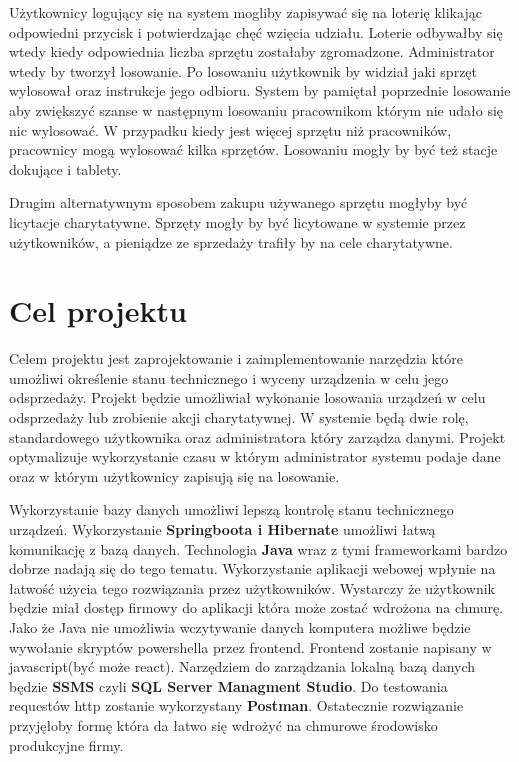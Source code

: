 Użytkownicy logujący się na system mogliby zapisywać się na loterię klikając odpowiedni przycisk i potwierdzając chęć wzięcia udziału. Loterie odbywałby się wtedy kiedy odpowiednia liczba sprzętu zostałaby zgromadzone. Administrator wtedy by tworzył losowanie. Po losowaniu użytkownik by widział jaki sprzęt wylosował oraz instrukcje jego odbioru. System by pamiętał poprzednie losowanie aby zwiększyć szanse w następnym losowaniu pracownikom którym nie udało się nic wylosować. W przypadku kiedy jest więcej sprzętu niż pracowników, pracownicy mogą wylosować kilka sprzętów. Losowaniu mogły by być też stacje dokujące i tablety.

Drugim alternatywnym sposobem zakupu używanego sprzętu mogłyby być licytacje charytatywne. Sprzęty mogły by być licytowane w systemie przez użytkowników, a pieniądze ze sprzedaży trafiły by na cele charytatywne.
   
\section{Cel projektu}

Celem projektu jest zaprojektowanie i zaimplementowanie narzędzia które umożliwi określenie stanu technicznego i wyceny urządzenia w celu jego odsprzedaży. Projekt będzie umożliwiał wykonanie losowania urządzeń w celu odsprzedaży lub zrobienie akcji charytatywnej. W systemie będą dwie rolę, standardowego użytkownika oraz administratora który zarządza danymi. Projekt optymalizuje wykorzystanie czasu w którym administrator systemu podaje dane oraz w którym użytkownicy zapisują się na losowanie.

 Wykorzystanie bazy danych umożliwi lepszą kontrolę stanu technicznego urządzeń. Wykorzystanie \textbf{Springboota i Hibernate }umożliwi łatwą komunikację z bazą danych. Technologia \textbf{Java }wraz z tymi frameworkami bardzo dobrze nadają się do tego tematu. Wykorzystanie aplikacji webowej wpłynie na łatwość użycia tego rozwiązania przez użytkowników. Wystarczy że użytkownik będzie miał dostęp firmowy do aplikacji która może zostać wdrożona na chmurę. Jako że Java nie umożliwia wczytywanie danych komputera możliwe będzie wywołanie skryptów powershella przez frontend. Frontend zostanie napisany w javascript(być może react). Narzędziem do zarządzania lokalną bazą danych będzie \textbf{SSMS }czyli \textbf{SQL Server Managment Studio}. Do testowania requestów http zostanie wykorzystany \textbf{Postman}. Ostatecznie rozwiązanie przyjęłoby formę która da łatwo się wdrożyć na chmurowe środowisko produkcyjne firmy.